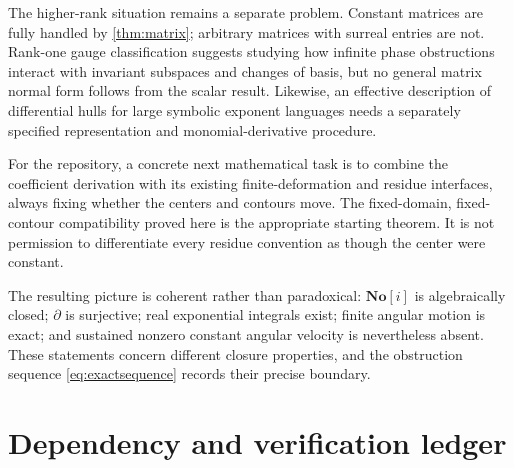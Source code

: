\documentclass[11pt,a4paper]{article}
\theoremstyle{definition}
\newcommand{\SC}{\mathbf{No}[i]}
\newcommand{\D}{\partial}
\numberwithin{equation}{section}
\begin{document}
The higher-rank situation remains a separate problem. Constant matrices
are fully handled by \cref{thm:matrix}; arbitrary matrices with surreal
entries are not. Rank-one gauge classification suggests studying how
infinite phase obstructions interact with invariant subspaces and changes
of basis, but no general matrix normal form follows from the scalar
result. Likewise, an effective description of differential hulls for
large symbolic exponent languages needs a separately specified
representation and monomial-derivative procedure.

For the repository, a concrete next mathematical task is to combine the
coefficient derivation with its existing finite-deformation and residue
interfaces, always fixing whether the centers and contours move. The
fixed-domain, fixed-contour compatibility proved here is the appropriate
starting theorem. It is not permission to differentiate every residue
convention as though the center were constant.

The resulting picture is coherent rather than paradoxical: $\SC$ is
algebraically closed; $\D$ is surjective; real exponential integrals
exist; finite angular motion is exact; and sustained nonzero constant
angular velocity is nevertheless absent. These statements concern
different closure properties, and the obstruction sequence
\eqref{eq:exactsequence} records their precise boundary.

\clearpage
\appendix
\section{Dependency and verification ledger}\label{app:ledger}
\end{document}
